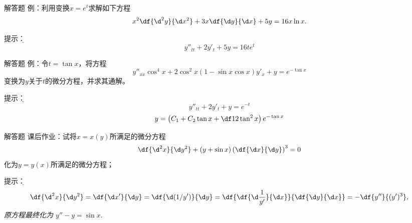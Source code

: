 \begin{frame}{解答题}
	\linespread{1.2}
	\alert{例：}利用变换$x=e^t$求解如下方程
	$$x^2\df{\d^2y}{\d x^2}+3x\df{\d y}{\d x}+5y=16x\ln x.$$
	
	\pause\alert{提示：}\it\b 
	$$y''_{tt}+2y'_t+5y=16te^{t}$$
	\pause {}
\end{frame}

\begin{frame}{解答题}
	\linespread{1.2}
	\alert{例：}令$t=\tan x$，将方程
	$$y''_{xx}\cos^4x+2\cos^2x(1-\sin x\cos x)y'_x+y=e^{-\tan x}$$
	变换为$y$关于$t$的微分方程，并求其通解。
	
	\pause\alert{提示：}\it\b 
	$$y''_{tt}+2y'_t+y=e^{-t}$$
	$$y=\left(C_1+C_2\tan x+\df12\tan^2x\right)e^{-\tan x}$$
\end{frame}

\begin{frame}{解答题}
	\linespread{1.2}
	\alert{课后作业：}试将$x=x(y)$所满足的微分方程
    $$\df{\d^2x}{\d y^2}+(y+\sin x)\left(\df{\d x}{\d y}\right)^3=0$$
    化为$y=y(x)$所满足的微分方程；
	
	\pause\alert{提示：}\it\b 
	$$\df{\d^2x}{\d y^2}=\df{\d x'}{\d y}
	=\df{\d(1/y')}{\d y}=
	\df{\df{\d\frac1{y'}}{\d x}}{\df{\d y}{\d x}}=-\df{y''}{(y')^3},$$
	原方程最终化为
	$y''-y=\sin x.$
\end{frame}



% 	



